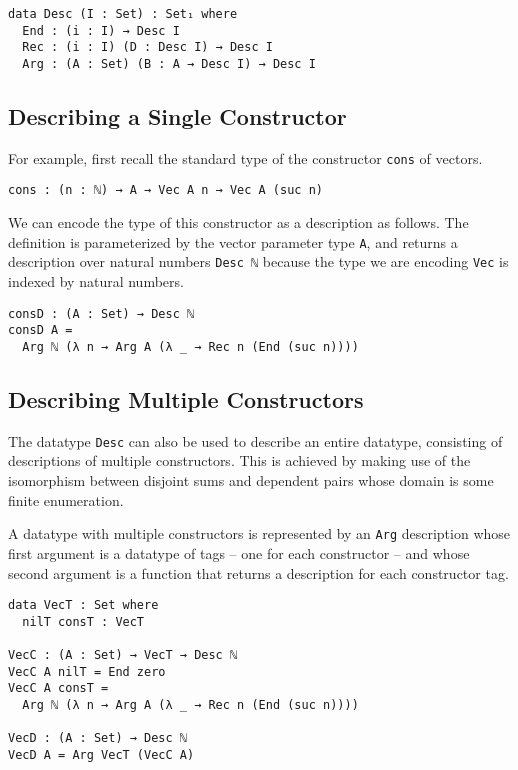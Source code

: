 \documentclass[preprint,nonatbib]{sigplanconf}
\begin{document}
\begin{verbatim}
data Desc (I : Set) : Set₁ where
  End : (i : I) → Desc I
  Rec : (i : I) (D : Desc I) → Desc I
  Arg : (A : Set) (B : A → Desc I) → Desc I
\end{verbatim}

\subsection{Describing a Single Constructor}

For example, first recall the standard type of the
constructor {\tt cons} of vectors.

\begin{verbatim}
cons : (n : ℕ) → A → Vec A n → Vec A (suc n)
\end{verbatim}

We can encode the type of this constructor as a description as
follows. The definition is parameterized by the vector parameter
type {\tt A}, and returns a description over natural numbers
{\tt Desc ℕ} because the type we are encoding {\tt Vec}
is indexed by natural numbers.

\begin{verbatim}
consD : (A : Set) → Desc ℕ
consD A =
  Arg ℕ (λ n → Arg A (λ _ → Rec n (End (suc n))))
\end{verbatim}

\subsection{Describing Multiple Constructors}

The datatype {\tt Desc} can also be used to describe an entire
datatype, consisting of descriptions of multiple constructors.
This is achieved by making use of the isomorphism between disjoint
sums and dependent pairs whose domain is some finite enumeration.

A datatype with multiple constructors is represented by an
{\tt Arg} description whose first argument is a datatype of tags
-- one for each constructor -- and whose second argument is
a function that returns a description for each constructor tag.

\begin{verbatim}
data VecT : Set where
  nilT consT : VecT

VecC : (A : Set) → VecT → Desc ℕ
VecC A nilT = End zero
VecC A consT =
  Arg ℕ (λ n → Arg A (λ _ → Rec n (End (suc n))))

VecD : (A : Set) → Desc ℕ
VecD A = Arg VecT (VecC A)
\end{verbatim}
\end{document}
